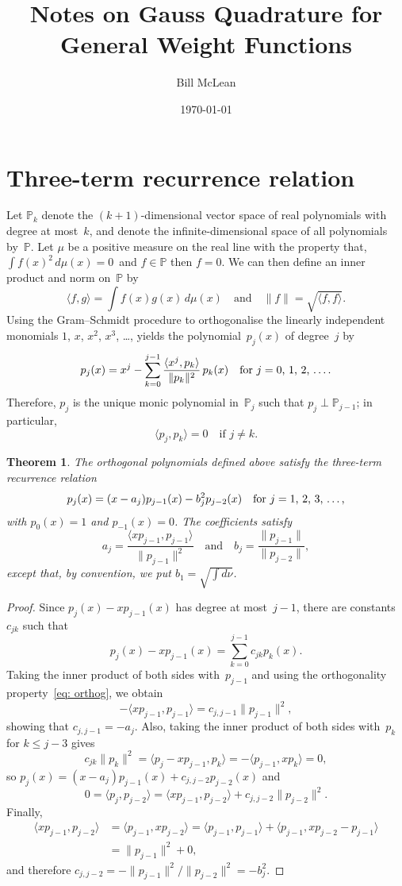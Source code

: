 \documentclass[12pt,a4paper]{article}
\title{Notes on Gauss Quadrature for General Weight Functions}
\author{Bill McLean}
\date{\today}
\newtheorem{theorem}{Theorem}
\newcommand{\iprod}[1]{\langle#1\rangle}
\newcommand{\Poly}{\mathbb{P}}
\begin{document}
\maketitle
\tableofcontents
\section{Three-term recurrence relation}
Let $\Poly_k$ denote the $(k+1)$-dimensional vector space of real 
polynomials with degree at most~$k$, and denote the 
infinite-dimensional space of all polynomials by~$\Poly$.  Let $\mu$ 
be a positive measure on the real line with the property that, 
$\int f(x)^2\,d\mu(x)=0$~and $f\in\Poly$ then $f=0$.
We can then define an inner product and norm on~$\Poly$  by
\[
\iprod{f,g}=\int f(x)g(x)\,d\mu(x)\quad\text{and}\quad
\|f\|=\sqrt{\iprod{f,f}}.
\]
Using the Gram--Schmidt procedure to orthogonalise the linearly 
independent monomials $1$, $x$, $x^2$, $x^3$, \dots, yields the
polynomial~$p_j(x)$ of degree~$j$ by
\[
p_j(x)=x^j-\sum_{k=0}^{j-1}\frac{\iprod{x^j,p_k}}{\|p_k\|^2}\,p_k(x)
	\quad\text{for $j=0$, $1$, $2$, \dots.}
\]
Therefore, $p_j$ is the unique monic polynomial in~$\Poly_j$ such 
that $p_j\perp\Poly_{j-1}$; in particular,
\begin{equation}\label{eq: orthog}
\iprod{p_j,p_k}=0\quad\text{if $j\ne k$.}
\end{equation}

\begin{theorem}\label{thm: 3 term}
The orthogonal polynomials defined above satisfy the three-term 
recurrence relation
\[
p_j(x)=(x-a_j)p_{j-1}(x)-b_j^2p_{j-2}(x)
	\quad\text{for $j=1$, $2$, $3$, \dots,}
\]
with $p_0(x)=1$ and $p_{-1}(x)=0$. The coefficients satisfy
\[
a_j=\frac{\iprod{xp_{j-1},p_{j-1}}}{\|p_{j-1}\|^2}
\quad\text{and}\quad
b_j=\frac{\|p_{j-1}\|}{\|p_{j-2}\|},
\]
except that, by convention, we put $b_1=\sqrt{\int d\nu}$.
\end{theorem}
\begin{proof}
Since $p_j(x)-xp_{j-1}(x)$ has degree at most~$j-1$, there are 
constants~$c_{jk}$ such that
\[
p_j(x)-xp_{j-1}(x)=\sum_{k=0}^{j-1}c_{jk}p_k(x).
\]
Taking the inner product of both sides with~$p_{j-1}$ and using
the orthogonality property~\eqref{eq: orthog}, we obtain
\[
-\iprod{xp_{j-1},p_{j-1}}=c_{j,j-1}\|p_{j-1}\|^2,
\]
showing that $c_{j,j-1}=-a_j$.  Also, taking the inner product of both
sides with~$p_k$ for $k\le j-3$ gives
\[
c_{jk}\|p_k\|^2=\iprod{p_j-xp_{j-1},p_k}=-\iprod{p_{j-1},xp_k}=0,
\]
so $p_j(x)=(x-a_j)p_{j-1}(x)+c_{j,j-2}p_{j-2}(x)$ and
\[
0=\iprod{p_j,p_{j-2}}=\iprod{xp_{j-1},p_{j-2}}+c_{j,j-2}\|p_{j-2}\|^2.
\]
Finally, 
\begin{align*}
\iprod{xp_{j-1},p_{j-2}}&=\iprod{p_{j-1},xp_{j-2}}
	=\iprod{p_{j-1},p_{j-1}}+\iprod{p_{j-1},xp_{j-2}-p_{j-1}}\\
	&=\|p_{j-1}\|^2+0,
\end{align*}
and therefore $c_{j,j-2}=-\|p_{j-1}\|^2/\|p_{j-2}\|^2=-b_j^2$.
\end{proof}
\end{document}
